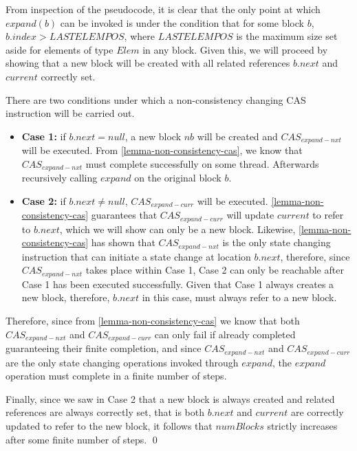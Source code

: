 \begin{prooftwo}

From inspection of the pseudocode, it is clear that the only point at which
$expand(b)$ can be invoked is under the condition that for some block $b$,
$b.index > LASTELEMPOS$, where $LASTELEMPOS$ is the maximum size set aside for
elements of type $Elem$ in any block. Given this, we will proceed  by showing
that a new block will be created with all related references  $b.next$ and
$current$ correctly set.

There are two conditions under which a non-consistency changing CAS
instruction will be carried out.

\begin{itemize}  \item \textbf{Case 1:} if $b.next=null$, a new block $nb$
will be created and $CAS_{expand-nxt}$ will be executed. From
\ref{lemma-non-consistency-cas},  we know that $CAS_{expand-nxt}$
must complete successfully on some thread. Afterwards recursively calling
$expand$ on the original block $b$. \item \textbf{Case 2:} if $b.next \neq
null$, $CAS_{expand-curr}$ will be executed. \ref{lemma-non-consistency-cas}
guarantees that $CAS_{expand-curr}$ will update $current$ to refer to $b.next$,  which we
will show can only be a new block. Likewise, \ref{lemma-non-consistency-cas}
has shown that  $CAS_{expand-nxt}$ is the only state changing instruction that can
initiate a state change  at location $b.next$, therefore, since $CAS_{expand-nxt}$ takes
place within Case 1, Case 2 can only be reachable after Case 1 has been
executed successfully. Given  that Case 1 always creates a new block,
therefore, $b.next$ in this case, must  always refer to a new block.
\end{itemize}

Therefore, since from \ref{lemma-non-consistency-cas} we know that both
$CAS_{expand-nxt}$ and $CAS_{expand-curr}$ can only fail if already completed
guaranteeing their finite completion, and since $CAS_{expand-nxt}$ and
$CAS_{expand-curr}$ are the only state changing operations invoked through
$expand$, the $expand$ operation must complete in a finite number of steps.

Finally, since we saw in Case 2 that a new block is always created and related
references are always correctly set, that is both $b.next $ and $current$ are
correctly updated to refer to the new block, it follows that $numBlocks$
strictly increases after some finite number of steps.
\qed
\end{prooftwo}


